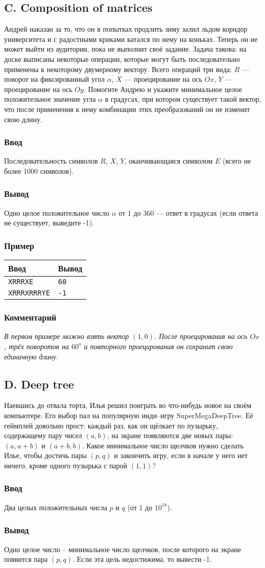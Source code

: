 \documentclass[10pt, a4paper]{article}
\newcommand{\informat}[1]
{
	\subsubsection*{Ввод} #1
}
\newcommand{\outformat}[1]
{
	\subsubsection*{Вывод} #1
}
\newcommand{\examplee}[4]
{
	\subsubsection*{Пример}
	\noindent
	\begin{center}
	\begin{tabularx}{\linewidth}{|X|X|}
	\hline
	Ввод 	& Вывод  	\\
	\hline
	{\tt #1} & {\tt #2}	\\
	\hline
	{\tt #3} & {\tt #4}	\\
	\hline
	\end{tabularx}
	\end{center}
}
\newcommand{\excomm}[1]
{
	\subsubsection*{Комментарий}
	\textit{#1}
}
\begin{document}
\subsection*{C. Composition of matrices}

Андрей наказан за то, что он в попытках продлить зиму залил льдом коридор университета и с радостными криками катался по нему на коньках. Теперь он не может выйти из аудитории, пока не выполнит своё задание. Задача такова: на доске выписаны некоторые операции, которые могут быть последовательно применены к некоторому двумерному вектору. Всего операций три вида: $R$ --- поворот на фиксированный угол $\alpha$, $X$ --- проецирование на ось $Ox$, $Y$ --- проецирование на ось $Oy$. Помогите Андрею и укажите минимальное целое положительное значение угла $\alpha$ в градусах, при котором существует такой вектор, что после применения к нему комбинации этих преобразований он не изменит свою длину.

\informat{Последовательность символов $R$, $X$, $Y$, оканчивающаяся символом $E$ (всего не более 1000 символов).}

\outformat{Одно целое положительное число $\alpha$ от 1 до 360 --- ответ в градусах (если ответа не существует, выведите -1).}

\examplee{XRRRXE}{60}{XRRRXRRRYE}{-1}

\excomm{В первом примере можно взять вектор $(1, 0)$. После проецирования на ось $Ox$, трёх поворотов на $60^{o}$ и повторного проецирования он сохранит свою единичную длину.}


\subsection*{D. Deep tree}

Наевшись до отвала торта, Илья решил поиграть во что-нибудь новое на своём компьютере. Его выбор пал на популярную инди--игру SuperMegaDeepTree. Её геймплей довольно прост: каждый раз, как он щёлкает по пузырьку, содержащему пару чисел $(a, b)$, на экране появляются две новых пары: $(a, a+b)$ и $(a+b, b)$. Какое минимальное число щелчков нужно сделать Илье, чтобы достичь пары $(p, q)$ и закончить игру, если в начале у него нет ничего, кроме одного пузырька с парой $(1, 1)$?

\informat{Два целых положительных числа $p$ и $q$ (от 1 до $10^{18}$).}

\outformat{Одно целое число -- минимальное число щелчков, после которого на экране появится пара $(p, q)$. Если эта цель недостижима, то вывести -1.}
\end{document}
